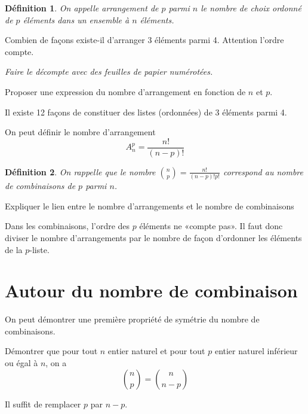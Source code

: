 \documentclass[12pt,a4paper,french]{article}
\theoremstyle{break}
\newtheorem{definition}{Définition}
\theoremstyle{plain}
\theoremstyle{nonumberplain}
\theoremstyle{nonumberbreak}
\begin{document}
\begin{definition}
  On appelle \emph{arrangement} de $p$ parmi $n$ le nombre de choix
  ordonné de $p$ éléments dans un ensemble à $n$ éléments.
\end{definition}

\begin{question}[ID=arrangement]
  Combien de façons existe-il d'arranger 3 éléments parmi 4. Attention
  l'ordre compte.

  \emph{Faire le décompte avec des feuilles de papier numérotées.}

  Proposer une expression du nombre d'arrangement en fonction de $n$ et
  $p$.
\end{question}
\begin{solution}
  Il existe 12 façons de constituer des listes (ordonnées) de 3 éléments
  parmi 4.

  On peut définir le nombre d'arrangement \[ A_n^p = \frac{n!}{(n-p)!}
  \]
\end{solution}

\begin{definition}
  On rappelle que le nombre $\binom{n}{p} = \frac{n!}{(n-p)! p!}$
  correspond au \emph{nombre de combinaisons} de $p$ parmi $n$.
\end{definition}

\begin{question}[ID=combinaison_arrangement]
  Expliquer le lien entre le nombre d'arrangements et le nombre de
  combinaisons
\end{question}
\begin{solution}
  Dans les combinaisons, l'ordre des $p$ éléments ne «compte pas». Il
  faut donc diviser le nombre d'arrangements par le nombre de façon
  d'ordonner les éléments de la $p$-liste.
\end{solution}

\section{Autour du nombre de combinaison}

On peut démontrer une première propriété de symétrie du nombre de
combinaisons.

\begin{question}[ID=symétrie]
  Démontrer que pour tout $n$ entier naturel et pour tout $p$ entier
  naturel inférieur ou égal à $n$, on a \[ \binom{n}{p} = \binom{n}{n -
  p} \]
\end{question}
\begin{solution}
  Il suffit de remplacer $p$ par $n -p$.
\end{solution}
\end{document}
